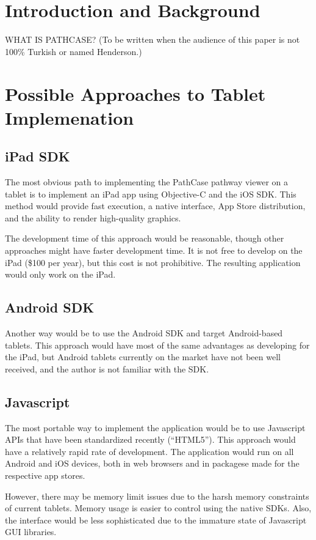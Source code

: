 \section{Introduction and Background}

WHAT IS PATHCASE? (To be written when the audience of this paper is not 100\% Turkish or named Henderson.)

\section{Possible Approaches to Tablet Implemenation}

\subsection{iPad SDK}

The most obvious path to implementing the PathCase pathway viewer on a tablet is to implement an iPad app using Objective-C and the iOS SDK. This method would provide fast execution, a native interface, App Store distribution, and the ability to render high-quality graphics.

The development time of this approach would be reasonable, though other approaches might have faster development time. It is not free to develop on the iPad (\$100 per year), but this cost is not prohibitive. The resulting application would only work on the iPad.

\subsection{Android SDK}

Another way would be to use the Android SDK and target Android-based tablets. This approach would have most of the same advantages as developing for the iPad, but Android tablets currently on the market have not been well received, and the author is not familiar with the SDK.

\subsection{Javascript}

The most portable way to implement the application would be to use Javascript APIs that have been standardized recently (``HTML5''). This approach would have a relatively rapid rate of development. The application would run on all Android and iOS devices, both in web browsers and in packagese made for the respective app stores.

However, there may be memory limit issues due to the harsh memory constraints of current tablets. Memory usage is easier to control using the native SDKs. Also, the interface would be less sophisticated due to the immature state of Javascript GUI libraries.
